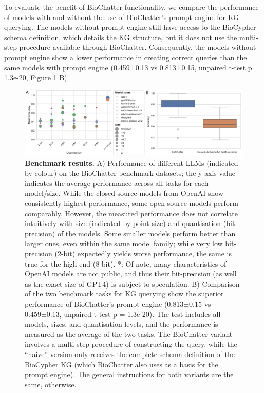 To evaluate the benefit of BioChatter functionality, we compare the performance of models with and without the use of BioChatter's prompt engine for KG querying.
The models without prompt engine still have access to the BioCypher schema definition, which details the KG structure, but it does not use the multi-step procedure available through BioChatter.
Consequently, the models without prompt engine show a lower performance in creating correct queries than the same models with prompt engine (0.459±0.13 vs 0.813±0.15, unpaired t-test p = 1.3e-20, Figure \ref{fig:benchmark} B).

\begin{figure}
\hypertarget{fig:benchmark}{%
\centering
\includegraphics{images/biochatter_benchmark.png}
\caption{\textbf{Benchmark results.}
A) Performance of different LLMs (indicated by colour) on the BioChatter benchmark datasets; the y-axis value indicates the average performance across all tasks for each model/size.
While the closed-source models from OpenAI show consistently highest performance, some open-source models perform comparably.
However, the measured performance does not correlate intuitively with size (indicated by point size) and quantisation (bit-precision) of the models.
Some smaller models perform better than larger ones, even within the same model family; while very low bit-precision (2-bit) expectedly yields worse performance, the same is true for the high end (8-bit).
*: Of note, many characteristics of OpenAI models are not public, and thus their bit-precision (as well as the exact size of GPT4) is subject to speculation.
B) Comparison of the two benchmark tasks for KG querying show the superior performance of BioChatter's prompt engine (0.813±0.15 vs 0.459±0.13, unpaired t-test p = 1.3e-20).
The test includes all models, sizes, and quantisation levels, and the performance is measured as the average of the two tasks.
The BioChatter variant involves a multi-step procedure of constructing the query, while the ``naive'' version only receives the complete schema definition of the BioCypher KG (which BioChatter also uses as a basis for the prompt engine).
The general instructions for both variants are the same, otherwise.}\label{fig:benchmark}
}
\end{figure}

